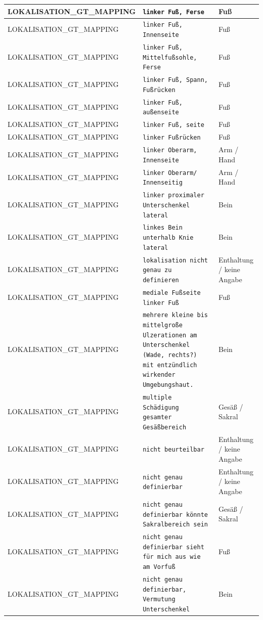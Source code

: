 \begin{longtable}{|p{3.5cm}|p{5cm}|p{6.5cm}|}
LOKALISATION\_GT\_MAPPING & \texttt{linker Fuß, Ferse} & Fuß \\ \hline
LOKALISATION\_GT\_MAPPING & \texttt{linker Fuß, Innenseite} & Fuß \\ \hline
LOKALISATION\_GT\_MAPPING & \texttt{linker Fuß, Mittelfußsohle, Ferse} & Fuß \\ \hline
LOKALISATION\_GT\_MAPPING & \texttt{linker Fuß, Spann, Fußrücken} & Fuß \\ \hline
LOKALISATION\_GT\_MAPPING & \texttt{linker Fuß, außenseite} & Fuß \\ \hline
LOKALISATION\_GT\_MAPPING & \texttt{linker Fuß, seite} & Fuß \\ \hline
LOKALISATION\_GT\_MAPPING & \texttt{linker Fußrücken} & Fuß \\ \hline
LOKALISATION\_GT\_MAPPING & \texttt{linker Oberarm, Innenseite} & Arm / Hand \\ \hline
LOKALISATION\_GT\_MAPPING & \texttt{linker Oberarm/ Innenseitig} & Arm / Hand \\ \hline
LOKALISATION\_GT\_MAPPING & \texttt{linker proximaler Unterschenkel lateral} & Bein \\ \hline
LOKALISATION\_GT\_MAPPING & \texttt{linkes Bein unterhalb Knie lateral} & Bein \\ \hline
LOKALISATION\_GT\_MAPPING & \texttt{lokalisation nicht genau zu definieren} & Enthaltung / keine Angabe \\ \hline
LOKALISATION\_GT\_MAPPING & \texttt{mediale Fußseite linker Fuß} & Fuß \\ \hline
LOKALISATION\_GT\_MAPPING & \texttt{mehrere kleine bis mittelgroße Ulzerationen am Unterschenkel (Wade, rechts?) mit entzündlich wirkender Umgebungshaut.} & Bein \\ \hline
LOKALISATION\_GT\_MAPPING & \texttt{multiple Schädigung gesamter Gesäßbereich} & Gesäß / Sakral \\ \hline
LOKALISATION\_GT\_MAPPING & \texttt{nicht beurteilbar} & Enthaltung / keine Angabe \\ \hline
LOKALISATION\_GT\_MAPPING & \texttt{nicht genau definierbar} & Enthaltung / keine Angabe \\ \hline
LOKALISATION\_GT\_MAPPING & \texttt{nicht genau definierbar könnte Sakralbereich sein} & Gesäß / Sakral \\ \hline
LOKALISATION\_GT\_MAPPING & \texttt{nicht genau definierbar sieht für mich aus wie am Vorfuß} & Fuß \\ \hline
LOKALISATION\_GT\_MAPPING & \texttt{nicht genau definierbar, Vermutung Unterschenkel} & Bein \\ \hline

\end{longtable}
